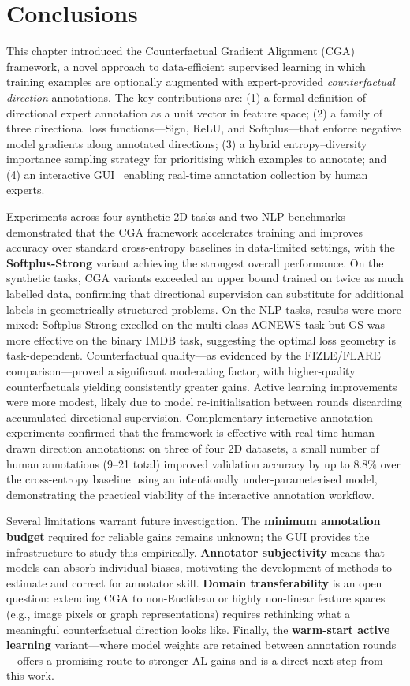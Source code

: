 \section{Conclusions}
\label{sec:conclusions}
This chapter introduced the Counterfactual Gradient Alignment (CGA) framework, a novel approach to data-efficient supervised learning in which training examples are optionally augmented with expert-provided \emph{counterfactual direction} annotations. The key contributions are: (1) a formal definition of directional expert annotation as a unit vector in feature space; (2) a family of three directional loss functions---Sign, ReLU, and Softplus---that enforce negative model gradients along annotated directions; (3) a hybrid entropy--diversity importance sampling strategy for prioritising which examples to annotate; and (4) an interactive GUI~\cite{erskine2024ijcai} enabling real-time annotation collection by human experts.

Experiments across four synthetic 2D tasks and two NLP benchmarks demonstrated that the CGA framework accelerates training and improves accuracy over standard cross-entropy baselines in data-limited settings, with the \textbf{Softplus-Strong} variant achieving the strongest overall performance. On the synthetic tasks, CGA variants exceeded an upper bound trained on twice as much labelled data, confirming that directional supervision can substitute for additional labels in geometrically structured problems. On the NLP tasks, results were more mixed: Softplus-Strong excelled on the multi-class AGNEWS task but GS was more effective on the binary IMDB task, suggesting the optimal loss geometry is task-dependent. Counterfactual quality---as evidenced by the FIZLE/FLARE comparison---proved a significant moderating factor, with higher-quality counterfactuals yielding consistently greater gains. Active learning improvements were more modest, likely due to model re-initialisation between rounds discarding accumulated directional supervision. Complementary interactive annotation experiments confirmed that the framework is effective with real-time human-drawn direction annotations: on three of four 2D datasets, a small number of human annotations (9--21 total) improved validation accuracy by up to $8.8\%$ over the cross-entropy baseline using an intentionally under-parameterised model, demonstrating the practical viability of the interactive annotation workflow.

Several limitations warrant future investigation. The \textbf{minimum annotation budget} required for reliable gains remains unknown; the GUI provides the infrastructure to study this empirically. \textbf{Annotator subjectivity} means that models can absorb individual biases, motivating the development of methods to estimate and correct for annotator skill. \textbf{Domain transferability} is an open question: extending CGA to non-Euclidean or highly non-linear feature spaces (e.g., image pixels or graph representations) requires rethinking what a meaningful counterfactual direction looks like. Finally, the \textbf{warm-start active learning} variant---where model weights are retained between annotation rounds---offers a promising route to stronger AL gains and is a direct next step from this work.

